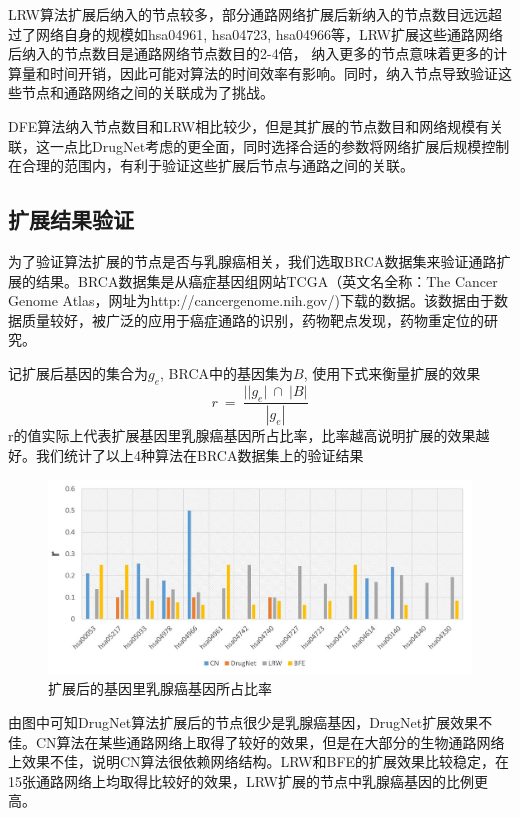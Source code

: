 LRW算法扩展后纳入的节点较多，部分通路网络扩展后新纳入的节点数目远远超过了网络自身的规模如hsa04961, hsa04723, hsa04966等，LRW扩展这些通路网络后纳入的节点数目是通路网络节点数目的2-4倍， 纳入更多的节点意味着更多的计算量和时间开销，因此可能对算法的时间效率有影响。同时，纳入节点导致验证这些节点和通路网络之间的关联成为了挑战。

DFE算法纳入节点数目和LRW相比较少，但是其扩展的节点数目和网络规模有关联，这一点比DrugNet考虑的更全面，同时选择合适的参数将网络扩展后规模控制在合理的范围内，有利于验证这些扩展后节点与通路之间的关联。

\subsection{扩展结果验证}
为了验证算法扩展的节点是否与乳腺癌相关，我们选取BRCA数据集来验证通路扩展的结果。BRCA数据集是从癌症基因组网站TCGA（英文名全称：The Cancer Genome Atlas，网址为http://cancergenome.nih.gov/)下载的数据。该数据由于数据质量较好，被广泛的应用于癌症通路的识别，药物靶点发现，药物重定位的研究。

记扩展后基因的集合为$g_{e}$, BRCA中的基因集为$B$, 使用下式来衡量扩展的效果
 \begin{equation}
r\ =\ \frac{||g_{e} |\ \cap \ |B|}{|g_{e} |}
 \end{equation}
r的值实际上代表扩展基因里乳腺癌基因所占比率，比率越高说明扩展的效果越好。我们统计了以上4种算法在BRCA数据集上的验证结果
\begin{figure}[h]
\centering
\includegraphics[width = 1.0\textwidth]{rate}
\caption[rate]{扩展后的基因里乳腺癌基因所占比率}
\label{rate}
\end{figure}

由图中可知DrugNet算法扩展后的节点很少是乳腺癌基因，DrugNet扩展效果不佳。CN算法在某些通路网络上取得了较好的效果，但是在大部分的生物通路网络上效果不佳，说明CN算法很依赖网络结构。LRW和BFE的扩展效果比较稳定，在15张通路网络上均取得比较好的效果，LRW扩展的节点中乳腺癌基因的比例更高。


